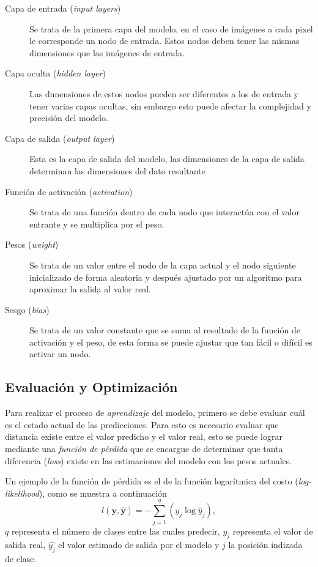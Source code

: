 \begin{description}
    \item[Capa de entrada (\emph{input layers})] { Se trata de la primera capa del modelo, en el caso de imágenes a cada pixel le corresponde un nodo de entrada. Estos nodos deben tener las mismas dimensiones que las imágenes de entrada.}
    \item[Capa oculta (\emph{hidden layer})] {Las dimensiones de estos nodos pueden ser diferentes a los de entrada y tener varias capas ocultas, sin embargo esto puede afectar la complejidad y precisión del modelo.} 
    \item[Capa de salida (\emph{output layer})]  {Esta es la capa de salida del modelo, las dimensiones de la capa de salida determinan las dimensiones del dato resultante}
    \item[Función de activación (\emph{activation})]{Se trata de una función dentro de cada nodo que interactúa con el valor entrante y se multiplica por el peso.}
    \item[Pesos (\emph{weight})] {Se trata de un valor entre el nodo de la capa actual y el nodo siguiente inicializado de forma aleatoria y después ajustado por un algoritmo para aproximar la salida al valor real.}  
    \item[Sesgo (\emph{bias})] {Se trata de un valor constante que se suma al resultado de la función de activación y el peso, de esta forma se puede ajustar que tan fácil o difícil es activar un nodo.} 
\end{description}

\subsection{Evaluación y Optimización}
Para realizar el proceso de \emph{aprendizaje} del modelo, primero se debe evaluar cuál es el estado actual de las predicciones. Para esto es necesario evaluar que distancia existe entre el valor predicho y el valor real, esto se puede lograr mediante una \emph{función de pérdida} que se encargue de determinar que tanta diferencia (\emph{loss}) existe en las estimaciones del modelo con los pesos actuales.

Un ejemplo de la función de pérdida es el de la función logarítmica del costo (\emph{log-likelihood}), como se muestra a continuación
\begin{equation}
    l(\mathbf{y}, \hat{\mathbf{y}}) = - \sum_{j=1}^q (y_j \log \hat{y}_j),     
\end{equation}
$q$ representa el número de clases entre las cuales predecir, $y_j$ representa el valor de salida real, $\hat{y_j}$ el valor estimado de salida por el modelo y $j$ la posición indizada de clase.

